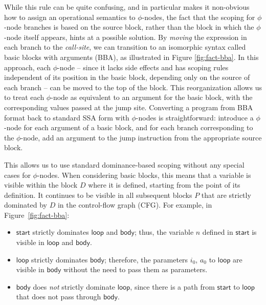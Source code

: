 \documentclass[acmsmall,screen,review]{acmart}
\newcommand{\ms}[1]{\ensuremath{\mathsf{#1}}}
\begin{document}
While this rule can be quite confusing, and in particular makes it non-obvious how to assign an
operational semantics to $\phi$-nodes, the fact that the scoping for $\phi$-node branches is based
on the source block, rather than the block in which the $\phi$-node itself appears, hints at a
possible solution. By \emph{moving} the expression in each branch to the \emph{call-site}, we can
transition to an isomorphic syntax called basic blocks with arguments (BBA), as illustrated in
Figure \ref{fig:fact-bba}. In this approach, each $\phi$-node -- since it lacks side effects and has
scoping rules independent of its position in the basic block, depending only on the source of each
branch -- can be moved to the top of the block. This reorganization allows us to treat each
$\phi$-node as equivalent to an argument for the basic block, with the corresponding values passed
at the jump site. Converting a program from BBA format back to standard SSA form with $\phi$-nodes
is straightforward: introduce a $\phi$-node for each argument of a basic block, and for each branch
corresponding to the $\phi$-node, add an argument to the jump instruction from the appropriate
source block. 

This allows us to use standard dominance-based scoping without any special cases for $\phi$-nodes.
When considering basic blocks, this means that a variable is visible within the block $D$ where it
is defined, starting from the point of its definition. It continues to be visible in all subsequent
blocks $P$ that are strictly dominated by $D$ in the control-flow graph (CFG). For example, in
Figure~\ref{fig:fact-bba}:
\begin{itemize}
  \item \ms{start} strictly dominates \ms{loop} and \ms{body}; thus, the variable $n$ defined in
  \ms{start} is visible in \ms{loop} and \ms{body}.
  \item \ms{loop} strictly dominates \ms{body}; therefore, the parameters $i_0$, $a_0$ to \ms{loop}
  are visible in \ms{body} without the need to pass them as parameters.
  \item \ms{body} does \emph{not} strictly dominate \ms{loop}, since there is a path from \ms{start}
  to \ms{loop} that does not pass through \ms{body}.
\end{itemize}
\end{document}
